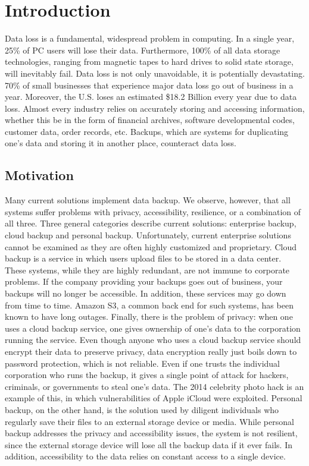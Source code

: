 \chapter{Introduction}
Data loss is a fundamental, widespread problem in computing. In a single year, 25\% of PC users will lose their data. Furthermore, 100\% of all data storage technologies, ranging from magnetic tapes to hard drives to solid state storage, will inevitably fail. \cite{imagineiti}  Data loss is not only unavoidable, it is potentially devastating. 70\% of small businesses that experience major data loss go out of business in a year. \cite{imagineiti} Moreover, the U.S. loses an estimated \$18.2 Billion every year due to data loss. \cite{pepperdine} Almost every industry relies on accurately storing and accessing information, whether this be in the form of financial archives, software developmental codes, customer data, order records, etc. Backups, which are systems for duplicating one’s data and storing it in another place, counteract data loss.


\section{Motivation}
Many current solutions implement data backup. We observe, however, that all systems suffer problems with privacy, accessibility, resilience, or a combination of all three. Three general categories describe current solutions: enterprise backup, cloud backup and personal backup. Unfortunately, current enterprise solutions cannot be examined as they are often highly customized and proprietary. Cloud backup is a service in which users upload files to be stored in a data center. These systems, while they are highly redundant, are not immune to corporate problems. If the company providing your backups goes out of business, your backups will no longer be accessible. In addition, these services may go down from time to time. Amazon S3, a common back end for such systems, has been known to have long outages. \cite{gigaom} \cite{rightscale} Finally, there is the problem of privacy: when one uses a cloud backup service, one gives ownership of one's data to the corporation running the service.  Even though anyone who uses a cloud backup service should encrypt their data to preserve privacy, data encryption really just boils down to password protection, which is not reliable. \cite{password}  Even if one trusts the individual corporation who runs the backup, it gives a single point of attack for hackers, criminals, or governments to steal one's data.  The 2014 celebrity photo hack is an example of this, in which vulnerabilities of Apple iCloud were exploited. \cite{theguardian}  Personal backup, on the other hand, is the solution used by diligent individuals who regularly save their files to an external storage device or media. While personal backup addresses the privacy and accessibility issues, the system is not resilient, since the external storage device will lose all the backup data if it ever fails. \cite{backblaze} In addition, accessibility to the data relies on constant access to a single device.

